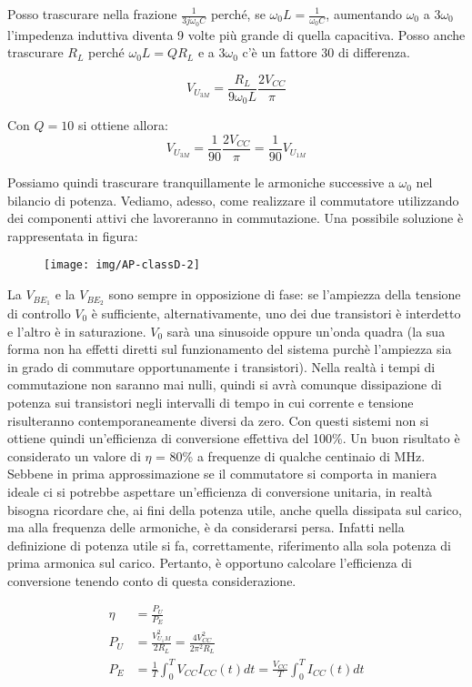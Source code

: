 Posso trascurare nella frazione $\frac{1}{3j\omega_0 C}$ perché, se $\omega_0 L = \frac{1}{\omega_0 C}$, aumentando $\omega_0$ a $3\omega_0$ l'impedenza induttiva diventa 9 volte più grande di quella capacitiva. Posso anche trascurare $R_L$ perché $\omega_0 L = Q R_L$ e a $3\omega_0$ c'è un fattore 30 di differenza.

\[V_{U_{3M}} = \frac{R_L}{9\omega_0 L} \frac{2V_{CC}}{\pi}\]

Con $Q=10$ si ottiene allora:
\[V_{U_{3M}} = \frac{1}{90} \frac{2V_{CC}}{\pi} = \frac{1}{90} V_{U_{1M}} \]

Possiamo quindi trascurare tranquillamente le armoniche successive a $\omega_0$ nel bilancio di potenza. Vediamo, adesso, come realizzare il commutatore utilizzando dei componenti attivi che lavoreranno
in commutazione. Una possibile soluzione è rappresentata in figura:

\begin{figure}[htb]
\centering
\texttt{[image: img/AP-classD-2]}
\caption{}
\label{fig:ap-classd-2}
\end{figure}

La $V_{BE_1}$ e la $V_{BE_2}$ sono sempre in opposizione di fase: se l'ampiezza della tensione di controllo $V_0$ è sufficiente, alternativamente, uno dei due transistori è interdetto e l'altro è in saturazione. $V_0$ sarà una sinusoide oppure un'onda quadra (la sua forma non ha effetti diretti sul funzionamento del sistema purchè l'ampiezza sia in grado di commutare opportunamente i transistori). Nella realtà i tempi di commutazione non saranno mai nulli, quindi si avrà comunque dissipazione di potenza sui
transistori negli intervalli di tempo in cui corrente e tensione risulteranno contemporaneamente
diversi da zero. Con questi sistemi non si ottiene quindi un'efficienza di conversione effettiva del
100\%. Un buon risultato è considerato un valore di $\eta$ = 80\% a frequenze di qualche centinaio di
MHz.
Sebbene in prima approssimazione se il commutatore si comporta in maniera ideale ci si potrebbe
aspettare un'efficienza di conversione unitaria, in realtà bisogna ricordare
che, ai fini della potenza utile, anche quella dissipata sul carico, ma alla frequenza delle armoniche,
è da considerarsi persa. Infatti nella definizione di potenza utile si fa, correttamente, riferimento
alla sola potenza di prima armonica sul carico. Pertanto, è opportuno calcolare l'efficienza di
conversione tenendo conto di questa considerazione.

$$
\begin{aligned}
\eta &= \frac{P_U}{P_E}\\
P_U  &= \frac{V_{U_1M}^2}{2 R_L} = \frac{4 V_{CC}^2}{2\pi^2 R_L}\\
P_E  &= \frac{1}{T} \int_{0}^{T} V_{CC} I_{CC}(t) dt
= \frac{V_{CC}}{T} \int_{0}^{T} I_{CC}(t) dt
\end{aligned}
$$

